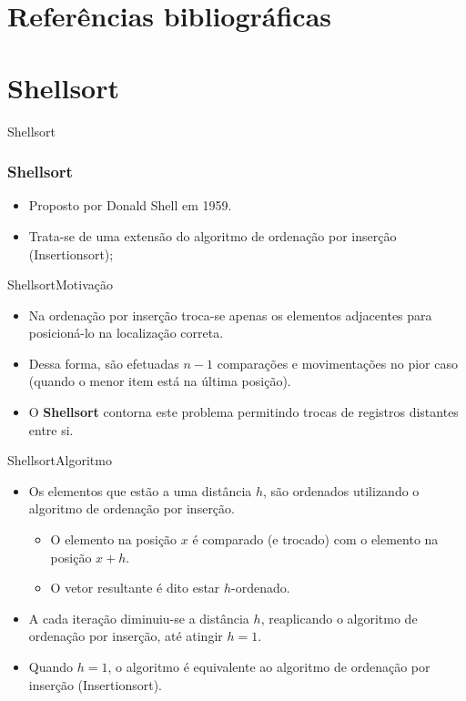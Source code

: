 \documentclass[aspectratio=169]{beamer}
\begin{document}

\section{Referências bibliográficas}

\section{Shellsort}

\begin{frame}
\Huge{\centerline{Shellsort}}
\end{frame}

\begin{frame}
\frametitle{Shellsort}
\begin{itemize}
\item Proposto por Donald Shell em 1959.
\item Trata-se de uma extensão do algoritmo de ordenação por inserção (Insertionsort);
\end{itemize}
\end{frame}


\begin{frame}{Shellsort}{Motivação}
\begin{itemize}
\item Na ordenação por inserção troca-se apenas os elementos adjacentes para posicioná-lo na localização correta.
\item Dessa forma, são efetuadas $n-1$ comparações e movimentações no pior caso (quando o menor item está na última posição).
\item O {\bf Shellsort} contorna este problema permitindo trocas de registros distantes entre si.
\end{itemize}
\end{frame}

\begin{frame}{Shellsort}{Algoritmo}
\begin{itemize}
\item Os elementos que estão a uma distância $h$, são ordenados utilizando o algoritmo de ordenação por inserção.
\begin{itemize}
\item O elemento na posição $x$ é comparado (e trocado) com o elemento na posição $x+h$.
\item O vetor resultante é dito estar $h$-ordenado.
\end{itemize}
\item A cada iteração diminuiu-se a distância $h$, reaplicando o algoritmo de ordenação por inserção, até atingir $h=1$. 
\item Quando $h=1$, o algoritmo é equivalente ao algoritmo de ordenação por inserção (Insertionsort).
\end{itemize}
\end{frame}
\end{document}
